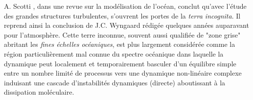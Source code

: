 A. Scotti \citep{scotti_large_2010}, dans une revue sur la modélisation de l'océan, conclut qu’avec l'étude des grandes structures turbulentes, s'ouvrent les portes de la \textit{terra incognita}. Il reprend ainsi la conclusion de J.C. Wyngaard \citep{wyngaard_toward_2004} rédigée quelques années auparavant pour l'atmosphère. Cette terre inconnue, souvent aussi qualifiée de "zone grise" abritant les \textit{fines échelles océaniques}, est plus largement considérée comme la région particulièrement mal connue du spectre océanique dans laquelle la dynamique peut localement et temporairement basculer d'un équilibre simple entre un nombre limité de processus vers une dynamique non-linéaire complexe induisant une cascade d'instabilités dynamiques (directe) aboutissant à la dissipation moléculaire. 
\color{black}
\color{blue}
